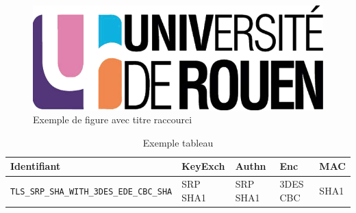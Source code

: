 \begin{figure}[H]
\begin{center}
\includegraphics[scale=0.2]{images/logo_univ.png}
\end{center}
\caption[Exemple 1]{Exemple de figure avec titre raccourci}
\label{fig1}
\end{figure}


\begin{table}[H]
\centering
\begin{tabularx}{17cm}{|l|l|l|X|l|}
\hline
\textbf{Identifiant} & \textbf{KeyExch} & \textbf{Authn}& \textbf{Enc}& \textbf{MAC}\\
\hline
\verb+TLS_SRP_SHA_WITH_3DES_EDE_CBC_SHA+&SRP SHA1&SRP SHA1&3DES CBC&SHA1\\
\hline
\end{tabularx}
\caption{Exemple tableau}
\label{tableauEx}
\end{table}

